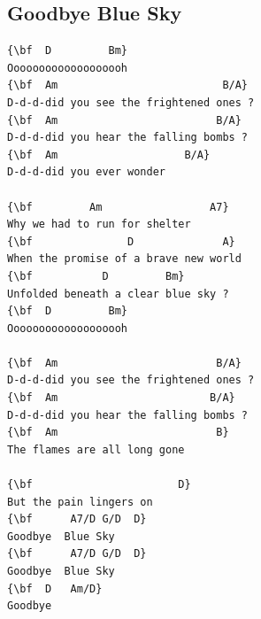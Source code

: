 \documentclass[a4paper]{article}
\begin{document}
\subsection{Goodbye Blue Sky}
\begin{multicols}{2}\begin{Verbatim}[commandchars=\\\{\}]
{\bf  D         Bm}
Ooooooooooooooooooh
{\bf  Am                          B/A}
D-d-d-did you see the frightened ones ?
{\bf  Am                         B/A}
D-d-d-did you hear the falling bombs ?
{\bf  Am                    B/A}
D-d-d-did you ever wonder

{\bf         Am                 A7}
Why we had to run for shelter
{\bf               D              A}
When the promise of a brave new world
{\bf           D         Bm}
Unfolded beneath a clear blue sky ?
{\bf  D         Bm}
Ooooooooooooooooooh

{\bf  Am                         B/A}
D-d-d-did you see the frightened ones ?
{\bf  Am                        B/A}
D-d-d-did you hear the falling bombs ?
{\bf  Am                         B}
The flames are all long gone

{\bf                       D}
But the pain lingers on
{\bf      A7/D G/D  D}
Goodbye  Blue Sky
{\bf      A7/D G/D  D}
Goodbye  Blue Sky
{\bf  D   Am/D}
Goodbye

\end{Verbatim}
\end{multicols}\newpage
\end{document}

